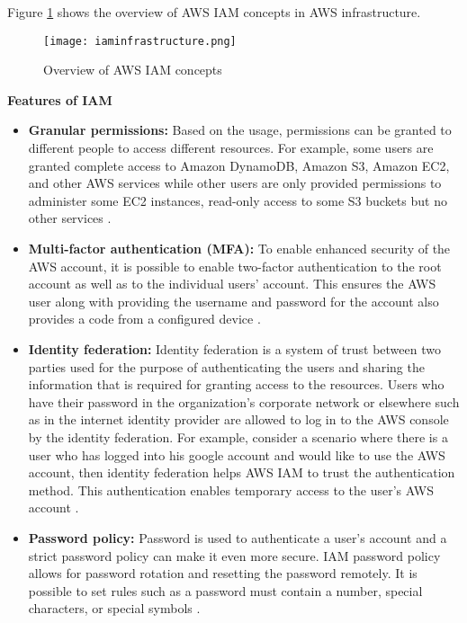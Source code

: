 Figure \ref{fig:iamidentities} shows the overview of AWS IAM concepts in AWS infrastructure.


\begin{figure}
    \centering
    \texttt{[image: iaminfrastructure.png]}
    \caption{Overview of AWS IAM concepts}{\cite{28}}
    \label{fig:iamidentities}
\end{figure}


\hfill \break

\textbf{Features of IAM}

\begin{itemize}
    \item \textbf{Granular permissions:} Based on the usage, permissions can be granted to different people to access
    different resources. For example, some users are
    granted complete access to Amazon DynamoDB, Amazon S3, Amazon EC2, and other AWS services while other users are only
    provided permissions to administer some EC2
    instances, read-only access to some S3 buckets but no other services \cite{27}.
\end{itemize}
\begin{itemize}
    \item \textbf{Multi-factor authentication (MFA):} To enable enhanced security of the AWS account, it is possible
    to enable
    two-factor authentication to the root account as well as to the individual users’ account. This ensures the AWS user along with providing the username and password for the account also provides a code from a configured device \cite{27}.
\end{itemize}
\begin{itemize}
    \item \textbf{Identity federation:} Identity federation is a system of trust between two parties used for the purpose of authenticating the users and sharing the information that is required for granting access to the resources.
    Users who have their password in the organization's
    corporate network or elsewhere such as in the
    internet identity provider are allowed to log in to the AWS console by the identity federation.
    For example, consider a scenario where there is a user who has logged into his google account and would like to use the AWS account, then identity federation helps AWS IAM to trust the authentication method.
    This authentication enables temporary access to the user’s AWS account \cite{27}.
\end{itemize}
\begin{itemize}
    \item \textbf{Password policy:} Password is used to authenticate a user’s account and a strict password policy
    can make it
    even more secure. IAM password policy allows for password rotation and resetting the password remotely. It is
    possible to set rules such as a password must contain a number, special characters, or special symbols \cite{27}.
\end{itemize}



